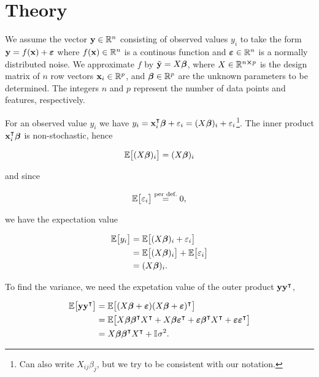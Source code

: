 \section{Theory}\label{sec:theroy}


We assume the vector $\vec{y} \in \RR[n]$ consisting of observed values $y_i$ to take the form $\vec{y}=f(\vec{x})+\svec{\epsilon}$ where $f(\vec{x})\in\RR[n]$ is a continous function and $\svec{\epsilon}\in \RR[n] $ is a normally distributed noise. We approximate $f$ by $\tilde{\vec{y}}=X\svec{\beta}$, where $X\in \RR[n\cross p]$ is the design matrix of $n$ row vectors $\vec{x}_i\in \RR[p]$, and $\svec{\beta}\in \RR[p]$ are the unknown parameters to be determined. The integers $n$ and $p$ represent the number of data points and features, respectively. 



For an observed value $y_i$ we have $y_i = \vec{x}_i\TT \svec{\beta} + \epsilon_i = \Xbi+ \epsilon_i$\footnote{Can also write $X_{ij}\beta_j$, but we try to be consistent with our notation.}. The inner product $\vec{x}_i\TT \svec{\beta}$ is non-stochastic, hence 

\begin{align*}
    \EE{\Xbi} = \Xbi
\end{align*}

and since 

\begin{align*}
    \EE{\epsilon_i} \stackrel{\text{per def.}}{=} 0,
\end{align*}

we have the expectation value

\begin{align*}
    \EE{y_i} &= \EE{\Xbi+ \epsilon_i} \\
    &= \EE{\Xbi} + \EE{\epsilon_i} \\
    &= \Xbi.
\end{align*}

To find the variance, we need the expetation value of the outer product $\vec{y}\vec{y}\TT$,

\begin{align}
    \EE{\vec{y} \vec{y}\TT} &= \EE{(X\svec{\beta} + \svec{\epsilon})(X\svec{\beta} + \svec{\epsilon})\TT} \nonumber\\
    &= \EE{\Xb \svec{\beta}\TT X\TT + \Xb \svec{\epsilon}\TT + \svec{\epsilon}\svec{\beta}\TT X\TT + \svec{\epsilon} \svec{\epsilon}\TT} \nonumber \\
    &= \Xb \svec{\beta}\TT X\TT + \II \sigma^2. \label{eq:expectation_yyT}
\end{align}

